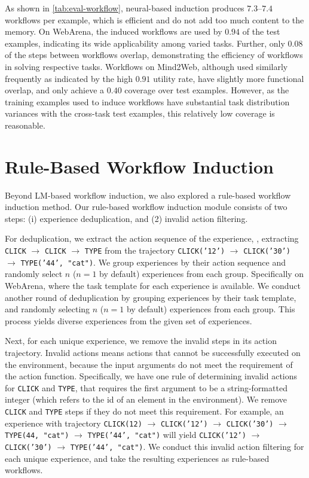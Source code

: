As shown in \autoref{tab:eval-workflow}, neural-based induction produces $7.3$--$7.4$ workflows per example, which is efficient and do not add too much content to the memory. 
On WebArena, the induced workflows are used by $0.94$ of the test examples, indicating its wide applicability among varied tasks. Further, only $0.08$ of the steps between workflows overlap, demonstrating the efficiency of workflows in solving respective tasks.
Workflows on Mind2Web, although used similarly frequently as indicated by the high $0.91$ utility rate, have slightly more functional overlap, and only achieve a $0.40$ coverage over test examples. However, as the training examples used to induce workflows have substantial task distribution variances with the cross-task test examples, this relatively low coverage is reasonable.



\section{Rule-Based Workflow Induction}
\label{app:rule-induction}

Beyond LM-based workflow induction, we also explored a rule-based workflow induction method. 
Our rule-based workflow induction module consists of two steps: (i) experience deduplication, and (2) invalid action filtering.

For deduplication, we extract the action sequence of the experience, \eg, extracting \texttt{CLICK} $\rightarrow$ \texttt{CLICK} $\rightarrow$ \texttt{TYPE} from the trajectory \texttt{CLICK('12')} $\rightarrow$ \texttt{CLICK('30')} $\rightarrow$ \texttt{TYPE('44', "cat")}. We group experiences by their action sequence and randomly select $n$ ($n=1$ by default) experiences from each group. Specifically on WebArena, where the task template for each experience is available. We conduct another round of deduplication by grouping experiences by their task template, and randomly selecting $n$ ($n=1$ by default) experiences from each group.
This process yields diverse experiences from the given set of experiences.

Next, for each unique experience, we remove the invalid steps in its action trajectory. Invalid actions means actions that cannot be successfully executed on the environment, because the input arguments do not meet the requirement of the action function. Specifically, we have one rule of determining invalid actions for \texttt{CLICK} and \texttt{TYPE}, that requires the first argument to be a string-formatted integer (which refers to the id of an element in the environment). We remove \texttt{CLICK} and \texttt{TYPE} steps if they do not meet this requirement. For example, an experience with trajectory \texttt{CLICK(12)} $\rightarrow$ \texttt{CLICK('12')} $\rightarrow$ \texttt{CLICK('30')} $\rightarrow$ \texttt{TYPE(44, "cat")} $\rightarrow$ \texttt{TYPE('44', "cat")} will yield \texttt{CLICK('12')} $\rightarrow$ \texttt{CLICK('30')} $\rightarrow$ \texttt{TYPE('44', "cat")}.
We conduct this invalid action filtering for each unique experience, and take the resulting experiences as rule-based workflows.


